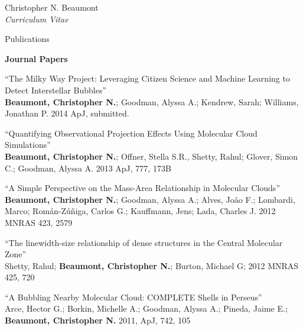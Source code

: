 \documentclass[10pt]{article}
\newenvironment{sublist}{%
	\begin{list}{}{%
		\setlength{\itemsep}{0em}\setlength{\parsep}{0em}%
		\setlength{\topsep}{0em}\setlength{\parskip}{0em}%
	}%
}%
{ \end{list} }
\begin{document}
\begin{cv}{Christopher N. Beaumont\\{\large \itshape Curriculum Vitae}}
\begin{cvlist}{Publications}
	\item \textbf{Journal Papers}
	\begin{sublist}
	\item ``The Milky Way Project: Leveraging Citizen Science and Machine Learning to Detect Interstellar Bubbles''\\
	\textbf{Beaumont, Christopher N.}; Goodman, Alyssa A.; Kendrew, Sarah; Williams, Jonathan P. 2014 ApJ, submitted. \\
	
	\item ``Quantifying Observational Projection Effects Using Molecular Cloud Simulations''\\
	\textbf{Beaumont, Christopher N.}; Offner, Stella S.R., Shetty, Rahul; Glover, Simon C.; Goodman, Alyssa A. 2013 ApJ, 777, 173B\\	
	\item ``A Simple Perspective on the Mass-Area Relationship in Molecular Clouds''\\
	\textbf{Beaumont, Christopher N.}; Goodman, Alyssa A.; Alves, Jo\~ao F.; Lombardi, Marco; Rom\'an-Z\'u\~niga, Carlos G.; Kauffmann, Jens; Lada, Charles J. 2012 MNRAS 423, 2579 \\
	
	\item ``The linewidth-size relationship of dense structures in the Central Molecular Zone''\\
	Shetty, Rahul; \textbf{Beaumont, Christopher N.}; Burton, Michael G; 2012 MNRAS 425, 720 \\
	
	\item ``A Bubbling Nearby Molecular Cloud: COMPLETE Shells in Perseus'' \\
          Arce, Hector G.; Borkin, Michelle A.; Goodman, Alyssa A.; Pineda, Jaime E.; \textbf{Beaumont, Christopher N.} 2011, ApJ, 742, 105 \\
          

\end{sublist}
\end{cvlist}
\end{cv}
\end{document}
